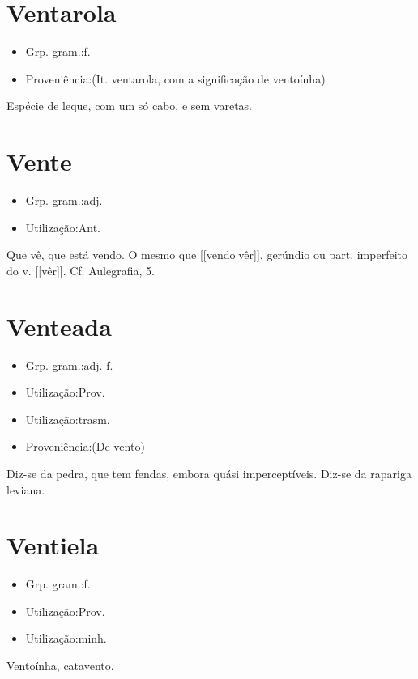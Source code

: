 \documentclass{article}
\begin{document}
\section{Ventarola}
\begin{itemize}
\item {Grp. gram.:f.}
\end{itemize}
\begin{itemize}
\item {Proveniência:(It. \textunderscore ventarola\textunderscore , com a significação de ventoínha)}
\end{itemize}
Espécie de leque, com um só cabo, e sem varetas.
\section{Vente}
\begin{itemize}
\item {Grp. gram.:adj.}
\end{itemize}
\begin{itemize}
\item {Utilização:Ant.}
\end{itemize}
Que vê, que está vendo.
O mesmo que [[vendo|vêr]], gerúndio ou part. imperfeito do v. [[vêr]]. Cf. \textunderscore Aulegrafia\textunderscore , 5.
\section{Venteada}
\begin{itemize}
\item {Grp. gram.:adj. f.}
\end{itemize}
\begin{itemize}
\item {Utilização:Prov.}
\end{itemize}
\begin{itemize}
\item {Utilização:trasm.}
\end{itemize}
\begin{itemize}
\item {Proveniência:(De \textunderscore vento\textunderscore )}
\end{itemize}
Diz-se da pedra, que tem fendas, embora quási imperceptíveis.
Diz-se da rapariga leviana.
\section{Ventiela}
\begin{itemize}
\item {Grp. gram.:f.}
\end{itemize}
\begin{itemize}
\item {Utilização:Prov.}
\end{itemize}
\begin{itemize}
\item {Utilização:minh.}
\end{itemize}
Ventoínha, catavento.
\end{document}
